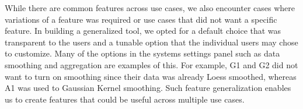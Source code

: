 {
\par While there are common features across use cases, we also encounter cases where variations of a feature was required or use cases that did not want a specific feature. In building a generalized tool, we opted for a default choice that was transparent to the users and a tunable option that the individual users may chose to customize. Many of the options in the systems settings panel such as data smoothing and aggregation are examples of this. For example, G1 and G2 did not want to turn on smoothing since their data was already Loess smoothed, whereas A1 was used to Gaussian Kernel smoothing. Such feature generalization enables us to create features that could be useful across multiple use cases.

}
